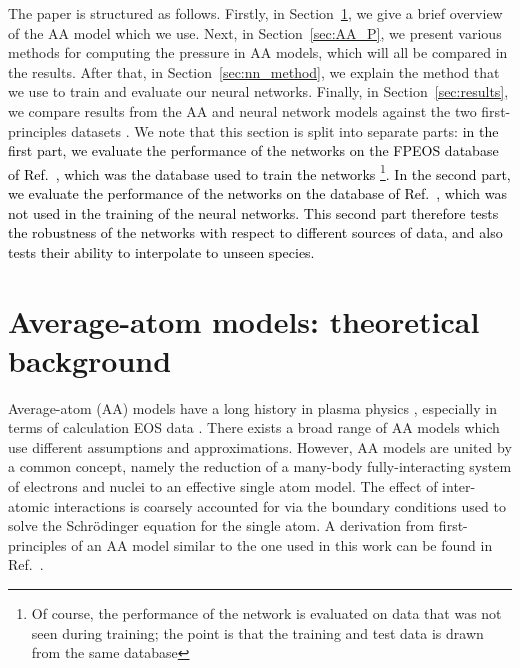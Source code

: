 \documentclass[%
 preprint,
 superscriptaddress,
 amsmath,amssymb,
longbibliography,
]{revtex4-2}
\newcommand{\change}[1]{\textcolor{black}{#1}}
\begin{document}
The paper is structured as follows. Firstly, in Section~\ref{sec:AA_review}, we give a brief overview of the AA model which we use. Next, in Section~\ref{sec:AA_P}, we present various methods for computing the pressure in AA models, which will all be compared in the results. After that, in Section~\ref{sec:nn_method}, we explain the method that we use to train and evaluate our neural networks. Finally, in Section~\ref{sec:results}, we compare results from the AA and neural network models against the two first-principles datasets \cite{Militzer_EOS_database,Hu_Be_EOS}. We note that this section is split into separate parts: \change{in the first part, we evaluate the performance of the networks on the FPEOS database of Ref.~\cite{Militzer_EOS_database}, which was the database used to train the networks \footnote{Of course, the performance of the network is evaluated on data that was not seen during training; the point is that the training and test data is drawn from the same database}. In the second part, we evaluate the performance of the networks on the database of Ref.~\cite{Hu_Be_EOS}, which was not used in the training of the neural networks. This second part therefore tests the robustness of the networks with respect to different sources of data, and also tests their ability to interpolate to unseen species.}




\section{Average-atom models: theoretical background}\label{sec:AA_review}

Average-atom (AA) models have a long history in plasma physics \cite{AA_Wigner_Seitz,AA_Feynmann,Liberman_1979,AA_Dharma_wardana, Rozsnyai,Callow_AA_22}, especially in terms of calculation EOS data \cite{AA_EOS_1,starrett_aa_pressure,Purgatorio,Pressure_warm_hot,VAAQP}. There exists a broad range of AA models which use different assumptions and approximations. However, AA models are united by a common concept, namely the reduction of a many-body fully-interacting system of electrons and nuclei to an effective single atom model. The effect of inter-atomic interactions is coarsely accounted for via the boundary conditions used to solve the Schr\"odinger equation for the single atom. A derivation from first-principles of an AA model similar to the one used in this work can be found in Ref.~\cite{Callow_AA_22}.
\end{document}
